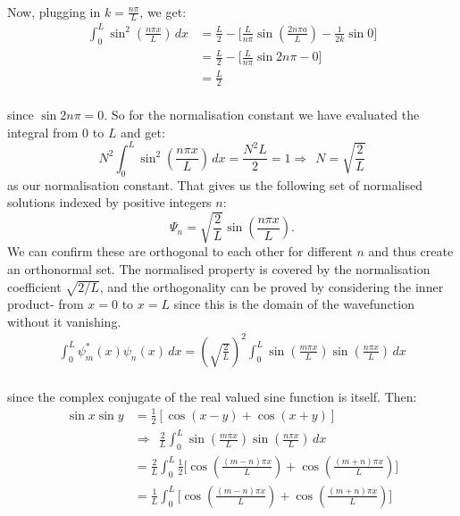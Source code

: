 \\
Now, plugging in $k=\frac{n\pi}{L}$, we get:
$$
\begin{aligned}
\int_{0}^{L}\sin^2\left(\frac{n\pi x}{L}\right) \,dx &= \frac{L}{2}-\biggl[\frac{L}{n\pi}\sin\left(\frac{2n\pi a}{L}\right)-\frac{1}{2k}\sin{0}\biggr]\\
&=\frac{L}{2}-\biggl[\frac{L}{n\pi}\sin{2n\pi}-0\biggr]\\
&=\frac{L}{2}
\end{aligned}
$$
\\
since $\sin{2n\pi}=0$. So for the normalisation constant we have evaluated the integral from $0$ to $L$ and get:
$$
N^2\int_{0}^{L}\sin^2\left(\frac{n\pi x}{L}\right) \,dx=\frac{N^2L}{2}=1 \Rightarrow\:\: N=\sqrt{\frac{2}{L}}
$$
as our normalisation constant. That gives us the following set of normalised solutions indexed by positive integers $n$:
$$
\Psi_n=\sqrt{\frac{2}{L}}\sin\left(\frac{n\pi x}{L}\right).
$$
We can confirm these are orthogonal to each other for different $n$ and thus create an orthonormal set. The normalised property is covered by the normalisation coefficient $\sqrt{{2}/{L}}$, and the orthogonality can be proved by considering the inner product- from $x=0$ to $x=L$ since this is the domain of the wavefunction without it vanishing.
    $$
    \begin{aligned}
    \int_{0}^{L} \psi^\ast_m(x)\psi_n(x) \,dx = \left(\sqrt{\frac{2}{L}}\right)^2\int_{0}^{L}\sin\left(\frac{m\pi x}{L}\right)\sin\left(\frac{n\pi x}{L}\right)\,dx
    \end{aligned}
    $$
    \\
    since the complex conjugate of the real valued sine function is itself. Then:
    $$
    \begin{aligned}
    \sin{x}\sin{y}&= \frac{1}{2}[\cos(x-y)+\cos(x+y)]\\
    &\Rightarrow\:\: \frac{2}{L}\int_{0}^{L}\sin\left(\frac{m\pi x}{L}\right)\sin\left(\frac{n\pi x}{L}\right)\,dx\\
    &=\frac{2}{L}\int_{0}^{L}\frac{1}{2}\biggl[\cos\left(\frac{(m-n)\pi x}{L}\right)+\cos\left(\frac{(m+n)\pi x}{L}\right)\biggr]\\
    &= \frac{1}{L}\int_{0}^{L}\biggl[\cos\left(\frac{(m-n)\pi x}{L}\right)+\cos\left(\frac{(m+n)\pi x}{L}\right)\biggr]\\
    \end{aligned}
    $$
